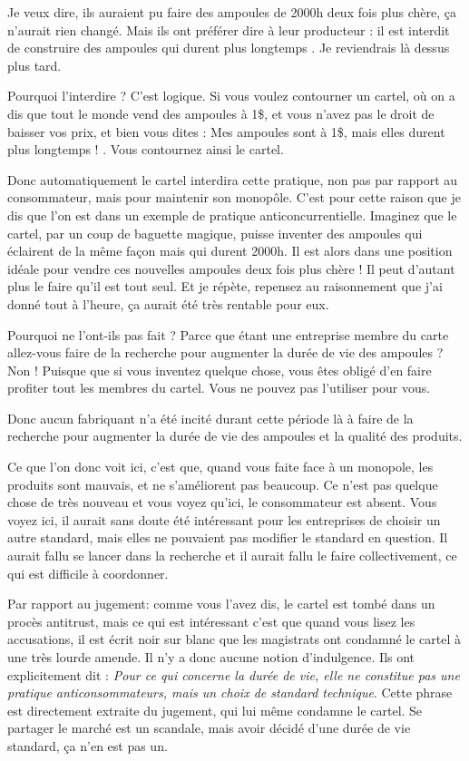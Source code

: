 \begin{small}
Je veux dire, ils auraient pu faire des ampoules de 2000h deux fois plus chère, ça n'aurait rien changé. Mais ils ont préférer dire à leur producteur :  \og il est interdit de construire des ampoules qui durent plus longtemps \fg{}. Je reviendrais là dessus plus tard.


Pourquoi l'interdire ? C'est logique. Si vous voulez contourner un cartel, où on a dis que tout le monde vend des ampoules à 1\$, et vous n'avez pas le droit de baisser vos prix, et bien vous dites :  \og Mes ampoules sont à 1\$, mais elles durent plus longtemps ! \fg{}. Vous contournez ainsi le cartel.

\smallbreak

Donc automatiquement le cartel interdira cette pratique, non pas par rapport au consommateur, mais pour maintenir son monopôle. C'est pour cette raison que je dis que l'on est dans un exemple de pratique anticoncurrentielle. Imaginez que le cartel, par un coup de baguette magique, puisse inventer des ampoules qui éclairent de la même façon mais qui durent 2000h. Il est alors dans une position idéale pour vendre ces nouvelles ampoules deux fois plus chère ! Il peut d'autant plus le faire qu'il est tout seul. Et je répète, repensez au raisonnement que j'ai donné tout à l'heure, ça aurait été très rentable pour eux. 

Pourquoi  ne l'ont-ils pas fait ? Parce que étant une entreprise membre du carte allez-vous faire de la recherche pour augmenter la durée de vie des ampoules ? Non ! Puisque que si vous inventez quelque chose, vous êtes obligé d'en faire profiter tout les membres du cartel. Vous ne pouvez pas l'utiliser pour vous.


Donc aucun fabriquant n'a été incité durant cette période là à faire de la recherche pour augmenter la durée de vie des ampoules et la qualité des produits.
\smallbreak 

Ce que l'on donc voit ici, c'est que, quand vous faite face à un monopole,  les produits sont mauvais, et ne s'améliorent pas beaucoup. Ce n'est pas quelque chose de très nouveau et vous voyez qu'ici, le consommateur est absent. Vous voyez ici, il aurait sans doute été intéressant pour les entreprises de choisir un autre standard, mais elles ne pouvaient pas modifier le standard en question. Il aurait fallu se lancer dans la recherche et il aurait fallu le faire collectivement, ce qui est difficile à coordonner.

\medbreak

Par rapport au jugement: comme vous l'avez dis, le cartel est tombé dans un procès antitrust, mais ce qui est intéressant c'est que quand vous lisez les accusations, il est écrit noir sur blanc que les magistrats ont condamné le cartel à une très lourde amende. Il n'y a donc aucune notion d'indulgence. Ils ont explicitement dit :  \textit{Pour ce qui concerne la durée de vie, elle ne constitue pas une pratique anticonsommateurs, mais un choix de standard technique}. Cette phrase est directement extraite du jugement, qui lui même condamne le cartel. Se partager le marché est un scandale, mais avoir décidé d'une durée de vie standard, ça n'en est pas un.


\end{small}
